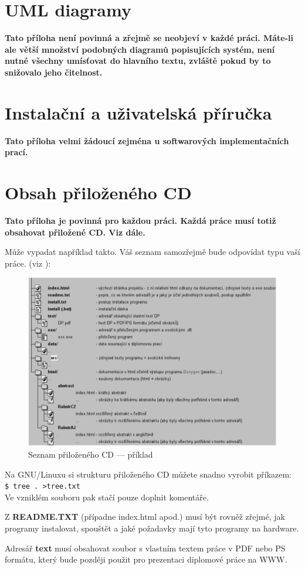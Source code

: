 \documentclass[11pt,twoside,a4paper]{book}
\begin{document}
\chapter{UML diagramy}
\textbf{\large Tato příloha není povinná a zřejmě se neobjeví v každé práci. Máte-li ale větší množství podobných diagramů popisujících systém, není nutné všechny umísťovat do hlavního textu, zvláště pokud by to snižovalo jeho čitelnost.}

\chapter{Instalační a uživatelská příručka}
\textbf{\large Tato příloha velmi žádoucí zejména u softwarových implementačních prací.}

\chapter{Obsah přiloženého CD}
\textbf{\large Tato příloha je povinná pro každou práci. Každá práce musí totiž obsahovat přiložené CD. Viz dále.}

Může vypadat například takto. Váš seznam samozřejmě bude odpovídat typu vaší práce. (viz \cite{infodp}):

\begin{figure}[h]
\begin{center}
\includegraphics[width=14cm]{figures/seznamcd}
\caption{Seznam přiloženého CD --- příklad}
\label{fig:seznamcd}
\end{center}
\end{figure}

Na GNU/Linuxu si strukturu přiloženého CD můžete snadno vyrobit příkazem:\\ 
\verb|$ tree . >tree.txt|\\
Ve vzniklém souboru pak stačí pouze doplnit komentáře.

Z \textbf{README.TXT} (případne index.html apod.)  musí být rovněž zřejmé, jak programy instalovat, spouštět a jaké požadavky mají tyto programy na hardware.

Adresář \textbf{text}  musí obsahovat soubor s vlastním textem práce v PDF nebo PS formátu, který bude později použit pro prezentaci diplomové práce na WWW.
\end{document}
